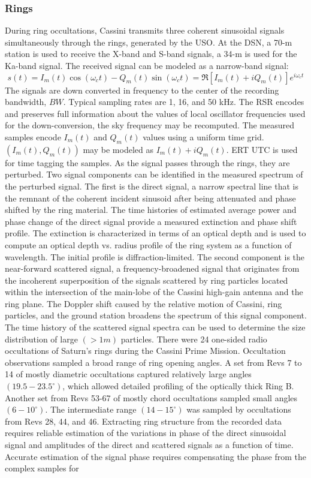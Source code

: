\documentclass[oneside]{book}
\theoremstyle{mystyle}
\begin{document}
\subsubsection{Rings}
During ring occultations, Cassini transmits three coherent sinusoidal signals simultaneously through the rings, generated by the USO. At the DSN, a 70-m station is used to receive the X-band and S-band signals, a 34-m is used for the Ka-band signal. The received signal can be modeled as a narrow-band signal:
\begin{equation}
s(t) = I_{m}(t)\cos(\omega_{c}t)-Q_{m}(t)\sin(\omega_{c}t) = \Re{[I_{m}(t)+iQ_{m}(t)]e^{i\omega_{c}t}}
\end{equation}
The signals are down converted in frequency to the center of the recording bandwidth, $BW$. Typical sampling rates are 1, 16, and 50 kHz. The RSR encodes and preserves full information about the values of local oscillator frequencies used for the down-conversion, the sky frequency may be recomputed. The measured samples encode $I_{m}(t)$ and $Q_{m}(t)$ values using a uniform time grid. $(I_{m}(t),Q_{m}(t))$ may be modeled as $I_{m}(t)+iQ_{m}(t)$. ERT UTC is used for time tagging the samples. As the signal passes through the rings, they are perturbed. Two signal components can be identified in the measured spectrum of the perturbed signal. The first is the direct signal, a narrow spectral line that is the remnant of the coherent incident sinusoid after being attenuated and phase shifted by the ring material. The time histories of estimated average power and phase change of the direct signal provide a measured extinction and phase shift profile. The extinction is characterized in terms of an optical depth and is used to compute an optical depth vs. radius profile of the ring system as a function of wavelength. The initial profile is diffraction-limited. The second component is the near-forward scattered signal, a frequency-broadened signal that originates from the incoherent superposition of the signals scattered by ring particles located within the intersection of the main-lobe of the Cassini high-gain antenna and the ring plane. The Doppler shift caused by the relative motion of Cassini, ring particles, and the ground station broadens the spectrum of this signal component. The time history of the scattered signal spectra can be used to determine the size distribution of large $(>1m)$ particles. There were 24 one-sided radio occultations of Saturn's rings during the Cassini Prime Mission. Occultation observations sampled a broad range of ring opening angles. A set from Revs 7 to 14 of mostly diametric occultations captured relatively large angles $(19.5-23.5^{\circ})$, which allowed detailed profiling of the optically thick Ring B. Another set from Revs 53-67 of mostly chord occultations sampled small angles $(6-10^{\circ})$. The intermediate range $(14-15^{\circ})$ was sampled by occultations from Revs 28, 44, and 46. Extracting ring structure from the recorded data requires reliable estimation of the variations in phase of the direct sinusoidal signal and amplitudes of the direct and scattered signals as a function of time. Accurate estimation of the signal phase requires compensating the phase from the complex samples for 
\end{document}
